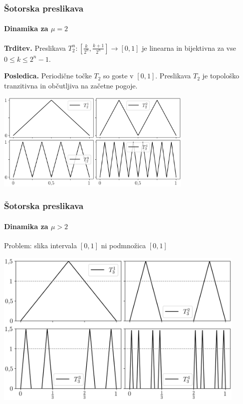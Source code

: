 \documentclass[12pt]{beamer}
\begin{document}
\begin{frame}
\frametitle{Šotorska preslikava}
\framesubtitle{Dinamika za $\mu = 2$}

\textbf{Trditev.}
Preslikava $T_2^n : [\frac{k}{2^n}, \frac{k+1}{2^n}] \rightarrow [0,1]$ je linearna in bijektivna za vse $0 \leq k \leq 2^n - 1$.

\medskip

\textbf{Posledica.}
Periodične točke $T_2$ so goste v $[0,1]$. Preslikava $T_2$ je topološko tranzitivna in občutljiva na začetne pogoje.

\medskip

\centering
\includegraphics[width=0.7\textwidth]{tent_2.png}

\end{frame}


\begin{frame}
\frametitle{Šotorska preslikava}
\framesubtitle{Dinamika za $\mu > 2$}

Problem: slika intervala $[0,1]$ ni podmnožica $[0,1]$

\bigskip

\centering
\includegraphics[width=0.9\textwidth]{tent_3.png}

\end{frame}
\end{document}
